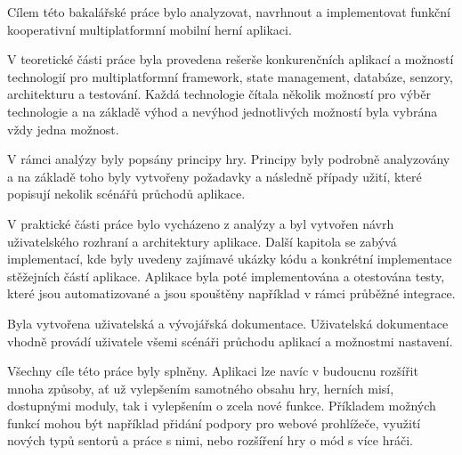 \begin{conclusion}
Cílem této bakalářské práce bylo analyzovat, navrhnout a implementovat
funkční kooperativní multiplatformní mobilní herní aplikaci. 

V teoretické části práce byla provedena rešerše konkurenčních aplikací
a možností technologií pro multiplatformní framework, state management,
databáze, senzory, architekturu a testování.
Každá technologie čítala několik možností pro výběr technologie
a na základě výhod a nevýhod jednotlivých možností byla vybrána vždy
jedna možnost.

V rámci analýzy byly popsány principy hry.
Principy byly podrobně analyzovány a na základě toho byly vytvořeny
požadavky a následně případy užití,
které popisují nekolik scénářů průchodů aplikace.

V praktické části práce bylo vycházeno z analýzy
a byl vytvořen návrh uživatelského rozhraní
a architektury aplikace.
Další kapitola se zabývá implementací,
kde byly uvedeny zajímavé ukázky kódu
a konkrétní implementace stěžejních částí aplikace.
Aplikace byla poté implementována a otestována testy,
které jsou automatizované a jsou spouštěny například v rámci průběžné integrace.

Byla vytvořena uživatelská a vývojářská dokumentace.
Uživatelská dokumentace vhodně provádí uživatele všemi scénáři průchodu
aplikací a možnostmi nastavení. 

Všechny cíle této práce byly splněny.
Aplikaci lze navíc v budoucnu rozšířit mnoha způsoby,
ať už vylepšením samotného obsahu hry, herních misí, dostupnými moduly,
tak i vylepšením o zcela nové funkce.
Příkladem možných funkcí mohou být například
přidání podpory pro webové prohlížeče,
využití nových typů sentorů a práce s nimi,
nebo rozšíření hry o mód s více hráči.
\end{conclusion}
